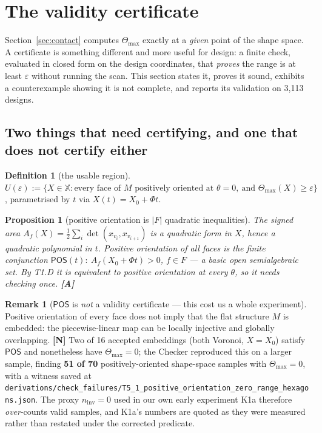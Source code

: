 \documentclass[11pt,a4paper]{article}
\newtheorem{proposition}[theorem]{Proposition}
\theoremstyle{definition}
\newtheorem{definition}[theorem]{Definition}
\newtheorem{remark}[theorem]{Remark}
\newcommand{\Tmax}{\Theta_{\max}}
\newcommand{\file}[1]{\texttt{\small #1}}
\newcommand{\POS}{\textsf{POS}}
\begin{document}
\clearpage
\section{The validity certificate}
\label{sec:certificate}

Section~\ref{sec:contact} computes $\Tmax$ exactly at a \emph{given} point of the shape
space. A certificate is something different and more useful for design: a finite check,
evaluated in closed form on the design coordinates, that \emph{proves} the range is at least
$\varepsilon$ without running the scan. This section states it, proves it sound, exhibits a
counterexample showing it is not complete, and reports its validation on 3{,}113 designs.

\subsection{Two things that need certifying, and one that does not certify either}

\begin{definition}[the usable region]
$U(\varepsilon) := \{X\in\mathbb{X} : \text{every face of }M\text{ positively oriented at }
\theta=0,\ \text{and } \Tmax(X)\ge\varepsilon\}$, parametrised by $t$ via $X(t)=X_0+\Phi t$.
\end{definition}

\begin{proposition}[positive orientation is $|F|$ quadratic inequalities]
The signed area $A_f(X)=\tfrac12\sum_i\det(x_{v_i},x_{v_{i+1}})$ is a quadratic form in $X$,
hence a quadratic polynomial in $t$. Positive orientation of all faces is the finite
conjunction $\POS(t):\ A_f(X_0+\Phi t)>0$, $f\in F$ --- a basic open semialgebraic set. By
T1.D it is equivalent to positive orientation at every $\theta$, so it needs checking once.
\textbf{[A]}
\end{proposition}

\begin{remark}[$\POS$ is \emph{not} a validity certificate --- this cost us a whole experiment]
Positive orientation of every face does not imply that the flat structure $M$ is embedded:
the piecewise-linear map can be locally injective and globally overlapping.
\textbf{[N]} Two of 16 accepted embeddings (both Voronoi, $X=X_0$) satisfy $\POS$ and
nonetheless have $\Tmax=0$; the Checker reproduced this on a larger sample, finding
\textbf{51 of 70} positively-oriented shape-space samples with $\Tmax=0$, with a witness
saved at
\file{derivations/check\_failures/T5\_1\_positive\_orientation\_zero\_range\_hexagons.json}.
The proxy $n_{\mathrm{inv}}=0$ used in our own early experiment K1a therefore
\emph{over}-counts valid samples, and K1a's numbers are quoted as they were measured rather
than restated under the corrected predicate.
\end{remark}
\end{document}
